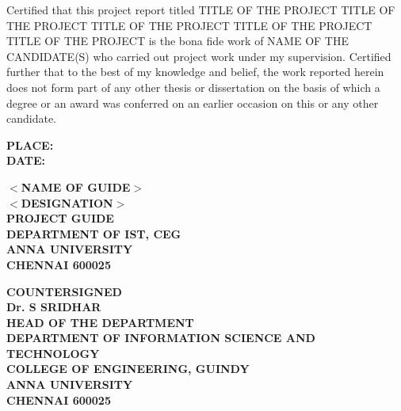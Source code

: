 \documentclass[13 pt,a4paper]{aureportm}
\begin{document}
\begin{spacing}{1.5}
  \begin{sloppypar}
  \fontsize{13}{14.5}\selectfont Certified that this project report titled TITLE OF THE PROJECT TITLE OF THE PROJECT TITLE OF THE PROJECT TITLE OF THE PROJECT TITLE OF THE PROJECT is the bona fide work of NAME OF THE CANDIDATE(S) who carried out project work under my supervision. Certified further that to the best of my knowledge and belief, the work reported herein does not form part of any other thesis or dissertation on the basis of which a degree or an award was conferred on an earlier occasion on this or any other candidate.
  \end{sloppypar}
\end{spacing}
\vspace{-0.3 cm}
\begin{flushleft}
 \parbox[t]{\datewidth}{\small{\textbf{PLACE: }}\\
 \small{\textbf{DATE: }}}
 \hfill
 \parbox[t]{6 cm}{\small{\textbf{$<$NAME OF GUIDE$>$}} \\
 \small{\textbf{$<$DESIGNATION$>$}}\\
 \small{\textbf{PROJECT GUIDE}}\\
 \small{\textbf{DEPARTMENT OF IST, CEG}}\\
 \small{\textbf{ANNA UNIVERSITY}}   \\
 \small{\textbf{CHENNAI  600025}}
 }
\end{flushleft}
\begin{center}
 \small{\textbf{COUNTERSIGNED}}\\
  \vspace{1.5 cm}
  \textbf{\small{Dr. S SRIDHAR}}\\ 
  \small{\textbf{HEAD OF THE DEPARTMENT}}\\
 \small{\textbf{DEPARTMENT OF INFORMATION SCIENCE AND TECHNOLOGY}}\\
 \small{\textbf{COLLEGE OF ENGINEERING, GUINDY}}\\
 \small{\textbf{ANNA UNIVERSITY}}   \\
 \small{\textbf{CHENNAI  600025}}

\end{center}




\end{document}
